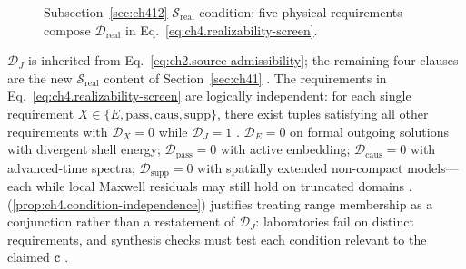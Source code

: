 \begin{figure}[t]
\centering
{}
\caption{Subsection~\ref{sec:ch412} $\mathcal{S}_{\mathrm{real}}$ condition: five physical requirements compose
\(\mathcal{D}_{\mathrm{real}}\) in Eq.~\eqref{eq:ch4.realizability-screen}.}
\label{fig:ch4.range membership-screen}
\end{figure}
\(\mathcal{D}_{J}\) is inherited from Eq.~\eqref{eq:ch2.source-admissibility}; the remaining four
clauses are the new $\mathcal{S}_{\mathrm{real}}$ content of Section~\ref{sec:ch41} \cite{stratton1941}.
\label{prop:ch4.condition-independence}
The requirements in Eq.~\eqref{eq:ch4.realizability-screen} are logically independent: for each single
requirement \(X\in\{E,\mathrm{pass},\mathrm{caus},\mathrm{supp}\}\), there exist tuples satisfying all
other requirements with \(\mathcal{D}_{X}=0\) while \(\mathcal{D}_{J}=1\) \cite{stratton1941}.
\(\mathcal{D}_{E}=0\) on formal outgoing solutions with divergent shell energy;
\(\mathcal{D}_{\mathrm{pass}}=0\) with active embedding;
\(\mathcal{D}_{\mathrm{caus}}=0\) with advanced-time spectra;
\(\mathcal{D}_{\mathrm{supp}}=0\) with spatially extended non-compact models---each while local
Maxwell residuals may still hold on truncated domains \cite{stratton1941}.
(\ref{prop:ch4.condition-independence}) justifies treating range membership as a conjunction rather
than a restatement of \(\mathcal{D}_{J}\): laboratories fail on distinct requirements, and synthesis checks must
test each condition relevant to the claimed \(\mathbf{c}\) \cite{devaney2004}.
